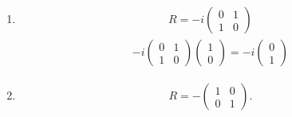 \begin{enumerate}
\begin{align*}
\begin{pmatrix}
        \end{pmatrix} 
        \right]\\
        =&
        \frac{\hbar}{2}
        \left[
        \cos\varphi 
        \begin{pmatrix}
            0 & 1 \\
            1 & 0
        \end{pmatrix}
        -i\sin\varphi 
        \begin{pmatrix}
            0 & -1 \\
            1 & 0
        \end{pmatrix}
        \right]\\
        =&\cos\varphi S_x -
        \sin\varphi S_y
    \end{align*}
    \item 
    \begin{align*}
        R= -i
        \begin{pmatrix}
            0 & 1\\
             1&0
        \end{pmatrix}
    \end{align*}
    \begin{align*}
        -i
        \begin{pmatrix}
            0 & 1\\
             1&0
        \end{pmatrix}
        \begin{pmatrix}
            1 \\ 0
        \end{pmatrix}
        =-i
        \begin{pmatrix}
            0 \\ 1
        \end{pmatrix}
    \end{align*}
    \item 
    \begin{align*}
        R=-
        \begin{pmatrix}
            1 & 0 \\0 & 1
        \end{pmatrix}.
    \end{align*}
\end{enumerate}
